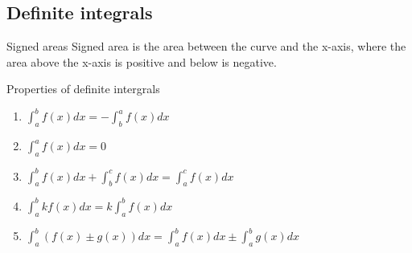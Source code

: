 \subsection{Definite integrals}
\begin{definition}
    {Signed areas}
    Signed area is the area between the curve and the x-axis, where the area above the x-axis is positive and below is negative.
\end{definition}
\begin{knBox}
    {Properties of definite intergrals}
    \begin{enumerate}
        \item $\int_{a}^{b}f(x)dx=-\int_{b}^{a}f(x)dx$
        \item $\int_{a}^{a}f(x)dx=0$
        \item $\int_{a}^{b}f(x)dx+\int_{b}^{c}f(x)dx=\int_{a}^{c}f(x)dx$
        \item $\int_{a}^{b}kf(x)dx=k\int_{a}^{b}f(x)dx$
        \item $\int_{a}^{b}(f(x)\pm g(x))dx=\int_{a}^{b}f(x)dx\pm\int_{a}^{b}g(x)dx$
    \end{enumerate}
\end{knBox}
